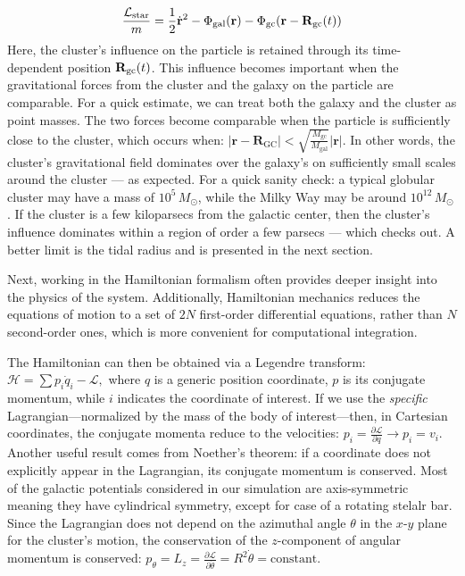         \begin{equation}\label{eq:starParticleLagrangian}
            \frac{\mathcal{L}_{\rm star}}{m} = \frac{1}{2} \dot{\mathbf{r}}^2 
                                - \Phi_{\rm gal}(\mathbf{r}) 
                                - \Phi_{\rm gc}(\mathbf{r} - \mathbf{R}_{\rm gc}(t))
        \end{equation}
        Here, the cluster's influence on the particle is retained through its time-dependent position \( \mathbf{R}_{\rm gc}(t) \). This influence becomes important when the gravitational forces from the cluster and the galaxy on the particle are comparable. For a quick estimate, we can treat both the galaxy and the cluster as point masses. The two forces become comparable when the particle is sufficiently close to the cluster, which occurs when: $|\mathbf{r} - \mathbf{R}_\mathrm{GC}| < \sqrt{\frac{M_{\mathrm{gc}}}{M_{\mathrm{ gal}}}} |\mathbf{r}|.$ In other words, the cluster's gravitational field dominates over the galaxy's on sufficiently small scales around the cluster — as expected. For a quick sanity check: a typical globular cluster may have a mass of \(10^5\, M_\odot\), while the Milky Way may be around \(10^{12}\, M_\odot\) \citep{2025NewAR.10001721H}. If the cluster is a few kiloparsecs from the galactic center, then the cluster's influence dominates within a region of order a few parsecs — which checks out. A better limit is the tidal radius and is presented in the next section.

        Next, working in the Hamiltonian formalism often provides deeper insight into the physics of the system. Additionally, Hamiltonian mechanics reduces the equations of motion to a set of \(2N\) first-order differential equations, rather than \(N\) second-order ones, which is more convenient for computational integration.

        The Hamiltonian can then be obtained via a Legendre transform: \(\mathcal{H} = \sum p_i \dot{q}_i - \mathcal{L},\) where $q$ is a generic position coordinate, $p$ is its conjugate momentum, while $i$ indicates the coordinate of interest. If we use the \textit{specific} Lagrangian—normalized by the mass of the body of interest—then, in Cartesian coordinates, the conjugate momenta reduce to the velocities: $p_i=\frac{\partial \mathcal{L}}{\partial q} \rightarrow p_i = v_i$. Another useful result comes from Noether's theorem: if a coordinate does not explicitly appear in the Lagrangian, its conjugate momentum is conserved. Most of the galactic potentials considered in our simulation are axis-symmetric meaning they have cylindrical symmetry, except for case of a rotating stelalr bar. Since the Lagrangian does not depend on the azimuthal angle \( \theta \) in the \(x\text{-}y\) plane for the cluster's motion, the conservation of the \(z\)-component of angular momentum is conserved: $p_\theta = L_z = \frac{\partial \mathcal{L}}{\partial \dot{\theta}} = R^2 \dot{\theta} = \mathrm{constant.}$

